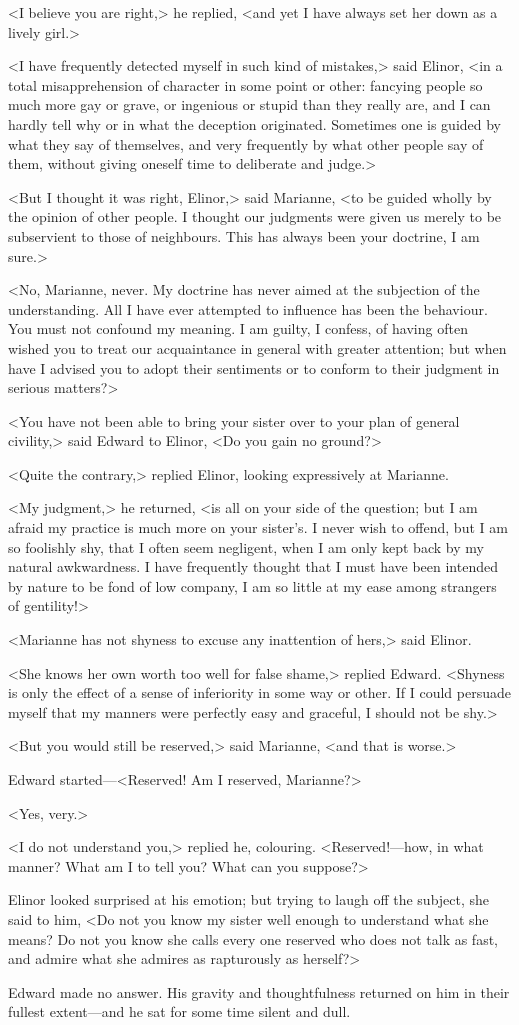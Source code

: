 <I believe you are right,> he replied, <and yet I have always set her down as a lively girl.>

<I have frequently detected myself in such kind of mistakes,> said Elinor, <in a total misapprehension of character in some point or other: fancying people so much more gay or grave, or ingenious or stupid than they really are, and I can hardly tell why or in what the deception originated. Sometimes one is guided by what they say of themselves, and very frequently by what other people say of them, without giving oneself time to deliberate and judge.>

<But I thought it was right, Elinor,> said Marianne, <to be guided wholly by the opinion of other people. I thought our judgments were given us merely to be subservient to those of neighbours. This has always been your doctrine, I am sure.>

<No, Marianne, never. My doctrine has never aimed at the subjection of the understanding. All I have ever attempted to influence has been the behaviour. You must not confound my meaning. I am guilty, I confess, of having often wished you to treat our acquaintance in general with greater attention; but when have I advised you to adopt their sentiments or to conform to their judgment in serious matters?>

<You have not been able to bring your sister over to your plan of general civility,> said Edward to Elinor, <Do you gain no ground?>

<Quite the contrary,> replied Elinor, looking expressively at Marianne.

<My judgment,> he returned, <is all on your side of the question; but I am afraid my practice is much more on your sister's. I never wish to offend, but I am so foolishly shy, that I often seem negligent, when I am only kept back by my natural awkwardness. I have frequently thought that I must have been intended by nature to be fond of low company, I am so little at my ease among strangers of gentility!>

<Marianne has not shyness to excuse any inattention of hers,> said Elinor.

<She knows her own worth too well for false shame,> replied Edward. <Shyness is only the effect of a sense of inferiority in some way or other. If I could persuade myself that my manners were perfectly easy and graceful, I should not be shy.>

<But you would still be reserved,> said Marianne, <and that is worse.>

Edward started—<Reserved! Am I reserved, Marianne?>

<Yes, very.>

<I do not understand you,> replied he, colouring. <Reserved!—how, in what manner? What am I to tell you? What can you suppose?>

Elinor looked surprised at his emotion; but trying to laugh off the subject, she said to him, <Do not you know my sister well enough to understand what she means? Do not you know she calls every one reserved who does not talk as fast, and admire what she admires as rapturously as herself?>

Edward made no answer. His gravity and thoughtfulness returned on him in their fullest extent—and he sat for some time silent and dull.
